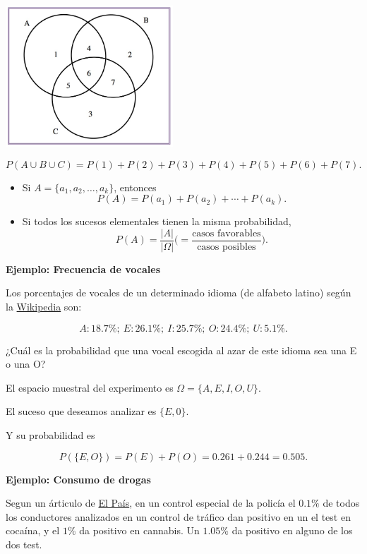 \documentclass[]{book}
\begin{document}
\includegraphics[width=\textwidth,height=2.08333in]{Images/proba1dibujos/tresconjunts.jpg}

\[P(A\cup B\cup C)=P(1)+P(2)+P(3)+P(4)+P(5)+P(6)+P(7).\]

\begin{itemize}
\item
  Si \(A=\{a_1,a_2,\ldots,a_k\}\), entonces
  \[
  P(A)=P(a_1)+P(a_2)+\cdots+P(a_k).
  \]
\item
  Si todos los sucesos elementales tienen la misma probabilidad,
  \[
  P(A)=\frac{|A|}{|\Omega|}\Big(=\frac{\mbox{casos favorables}}{\mbox{casos posibles}}\Big).
  \]
\end{itemize}

\textbf{Ejemplo: Frecuencia de vocales}

Los porcentajes de vocales de un determinado idioma (de alfabeto latino) según la \href{https://es.wikipedia.org/wiki/Frecuencia_de_aparici\%C3\%B3n_de_letras}{Wikipedia} son:

\[A: 18.7\%;\ E: 26.1\%;\ I: 25.7\%;\ O: 24.4\%;\  U: 5.1\%.\]

¿Cuál es la probabilidad que una vocal escogida al azar de este idioma sea una E o una O?

El espacio muestral del experimento es \(\Omega=\{A,E,I,O,U\}\).

El suceso que deseamos analizar es \(\{E,0\}\).

Y su probabilidad es

\[P(\{E,O\})=P(E)+P(O)=0.261+0.244=0.505.\]

\textbf{Ejemplo: Consumo de drogas}

Segun un árticulo de \href{https://elpais.com/politica/2019/01/02/actualidad/1546426491_623324.html}{El País}, en un control especial de la policía el \(0.1\%\) de todos los conductores analizados en un control de tráfico dan positivo en un el test en cocaína, y el \(1\%\) da positivo en cannabis. Un \(1.05\%\) da positivo en alguno de los dos test.
\end{document}
